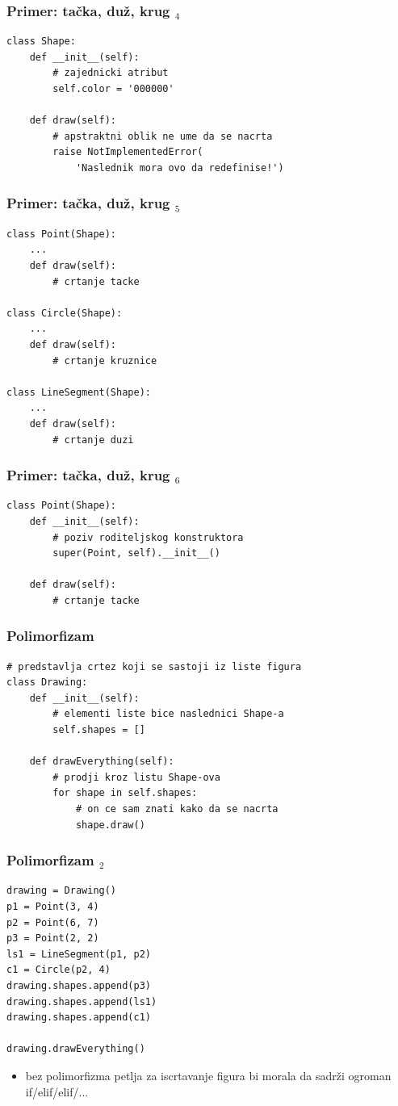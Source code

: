 \documentclass[utf8,compress,aspectratio=169]{beamer}
\begin{document}
\begin{frame}[fragile]
  \frametitle{Primer: tačka, duž, krug $_4$}
\begin{verbatim}
class Shape:
    def __init__(self):
        # zajednicki atribut
        self.color = '000000'

    def draw(self):
        # apstraktni oblik ne ume da se nacrta
        raise NotImplementedError(
            'Naslednik mora ovo da redefinise!')
\end{verbatim}
\end{frame}

\begin{frame}
  \frametitle{Primer: tačka, duž, krug $_5$}
\begin{verbatim}
class Point(Shape):
    ...
    def draw(self):
        # crtanje tacke

class Circle(Shape):
    ...
    def draw(self):
        # crtanje kruznice

class LineSegment(Shape):
    ...
    def draw(self):
        # crtanje duzi
\end{verbatim}
\end{frame}

\begin{frame}
  \frametitle{Primer: tačka, duž, krug $_6$}
\begin{verbatim}
class Point(Shape):
    def __init__(self):
        # poziv roditeljskog konstruktora
        super(Point, self).__init__()

    def draw(self):
        # crtanje tacke
\end{verbatim}
\end{frame}

\begin{frame}[fragile]
  \frametitle{Polimorfizam}
\begin{verbatim}
# predstavlja crtez koji se sastoji iz liste figura
class Drawing:
    def __init__(self):
        # elementi liste bice naslednici Shape-a
        self.shapes = []

    def drawEverything(self):
        # prodji kroz listu Shape-ova
        for shape in self.shapes:
            # on ce sam znati kako da se nacrta
            shape.draw()
\end{verbatim}
\end{frame}

\begin{frame}[fragile]
  \frametitle{Polimorfizam $_2$}
\begin{verbatim}
drawing = Drawing()
p1 = Point(3, 4)
p2 = Point(6, 7)
p3 = Point(2, 2)
ls1 = LineSegment(p1, p2)
c1 = Circle(p2, 4)
drawing.shapes.append(p3)
drawing.shapes.append(ls1)
drawing.shapes.append(c1)

drawing.drawEverything()
\end{verbatim}
  \begin{itemize}
    \item bez polimorfizma petlja za iscrtavanje figura bi morala da sadrži ogroman if/elif/elif/...
  \end{itemize}
\end{frame}
\end{document}
